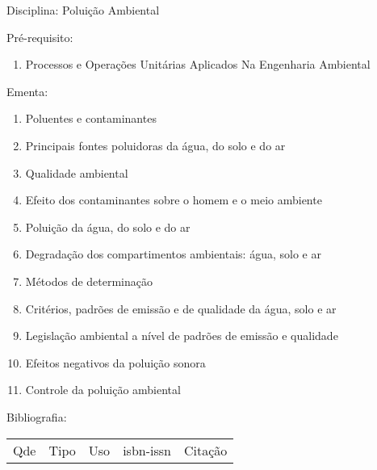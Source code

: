 \documentclass[12pt,a4paper,twoside]{report}
\begin{document}
Disciplina: Poluição Ambiental

Pré-requisito:
\begin{enumerate}
\item Processos e Operações Unitárias Aplicados Na Engenharia Ambiental
\end{enumerate}

Ementa:
\begin{enumerate}
\item Poluentes e contaminantes
\item Principais fontes poluidoras da água, do solo e do ar
\item Qualidade ambiental
\item Efeito dos contaminantes sobre o homem e o meio ambiente
\item Poluição da água, do solo e do ar
\item Degradação dos compartimentos ambientais: água, solo e ar
\item Métodos de determinação
\item Critérios, padrões de emissão e de qualidade da água, solo e ar
\item Legislação ambiental a nível de padrões de emissão e qualidade
\item Efeitos negativos da poluição sonora
\item Controle da poluição ambiental
\end{enumerate}

Bibliografia:
\begin{tabular}{lllll}
Qde & Tipo & Uso & isbn-issn & Citação \\
\end{tabular}
\end{document}
